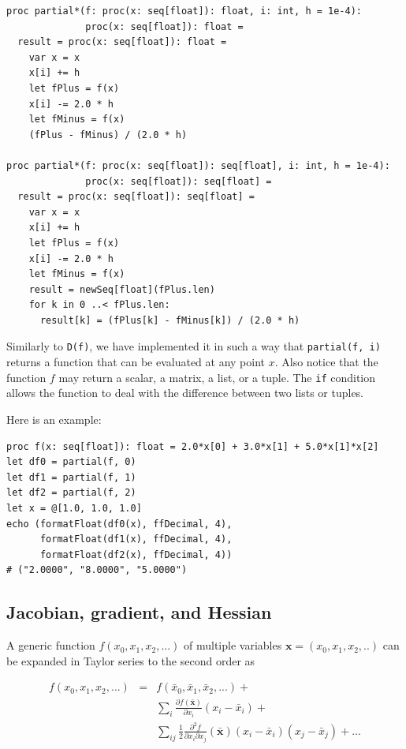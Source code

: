 \documentclass[justified, sixbynine]{tufte-book}
\def\ft{\small\tt}
\theoremstyle{plain}%
\newtheorem * {corollary}{Corollary}
\theoremstyle{definition}
\theoremstyle{remark}
\newtheorem * {remark}{Remark}
\newtheorem * {note}{Note}
\begin{document}
\begin{fullwidth}
\begin{lstlisting}[caption={in file: {\ft nlib.nim}}]
proc partial*(f: proc(x: seq[float]): float, i: int, h = 1e-4):
              proc(x: seq[float]): float =
  result = proc(x: seq[float]): float =
    var x = x
    x[i] += h
    let fPlus = f(x)
    x[i] -= 2.0 * h
    let fMinus = f(x)
    (fPlus - fMinus) / (2.0 * h)

proc partial*(f: proc(x: seq[float]): seq[float], i: int, h = 1e-4):
              proc(x: seq[float]): seq[float] =
  result = proc(x: seq[float]): seq[float] =
    var x = x
    x[i] += h
    let fPlus = f(x)
    x[i] -= 2.0 * h
    let fMinus = f(x)
    result = newSeq[float](fPlus.len)
    for k in 0 ..< fPlus.len:
      result[k] = (fPlus[k] - fMinus[k]) / (2.0 * h)
\end{lstlisting}

Similarly to {\ft D(f)}, we have implemented it in such a way that {\ft partial(f, i)} returns a function that can be evaluated at any point $x$. Also notice that the function $f$ may return a scalar, a matrix, a list, or a tuple. The {\ft if} condition allows the function to deal with the difference between two lists or tuples.

Here is an example:

\begin{lstlisting}
proc f(x: seq[float]): float = 2.0*x[0] + 3.0*x[1] + 5.0*x[1]*x[2]
let df0 = partial(f, 0)
let df1 = partial(f, 1)
let df2 = partial(f, 2)
let x = @[1.0, 1.0, 1.0]
echo (formatFloat(df0(x), ffDecimal, 4),
      formatFloat(df1(x), ffDecimal, 4),
      formatFloat(df2(x), ffDecimal, 4))
# ("2.0000", "8.0000", "5.0000")
\end{lstlisting}

\goodbreak\subsection{Jacobian, gradient, and Hessian}


A generic function $f(x_0, x_1, x_2, ...)$ of multiple variables $\mathbf{x}=(x_0, x_1, x_2, ..)$ can be expanded in Taylor series to the second order as

\begin{eqnarray}
f(x_0, x_1, x_2, ...) &=& f(\bar x_0, \bar x_1, \bar x_2, ...) + \\
&& \sum_i \frac{\partial f(\mathbf{\bar x})}{\partial x_i}(x_i-\bar x_i) + \\
&& \sum_{ij} \frac12 \frac{\partial^2 f}{\partial x_i\partial x_j}(\mathbf{\bar x})(x_i-\bar x_i)(x_j-\bar x_j) + ...
\end{eqnarray}


\end{fullwidth}
\end{document}
